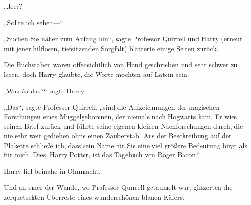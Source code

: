 …leer?

„Sollte ich sehen—“

„Suchen Sie näher zum Anfang hin“, sagte Professor Quirrell und Harry (erneut mit jener hilflosen, tiefsitzenden Sorgfalt) blätterte einige Seiten zurück.

Die Buchstaben waren offensichtlich von Hand geschrieben und sehr schwer zu lesen, doch Harry glaubte, die Worte mochten auf Latein sein.

„Was \emph{ist} das?“ sagte Harry.

„Das“, sagte Professor Quirrell, „sind die Aufzeichnungen der magischen Forschungen eines Muggelgeborenen, der niemals nach Hogwarts kam. Er wies seinen Brief zurück und führte seine eigenen kleinen Nachforschungen durch, die nie sehr weit gediehen ohne einen Zauberstab. Aus der Beschreibung auf der Plakette schließe ich, dass sein Name für Sie eine viel größere Bedeutung birgt als für mich. Dies, Harry Potter, ist das Tagebuch von Roger Bacon.“

Harry fiel beinahe in Ohnmacht.

Und an einer der Wände, wo Professor Quirrell getaumelt war, glitzerten die zerquetschten Überreste eines wunderschönen blauen Käfers.

